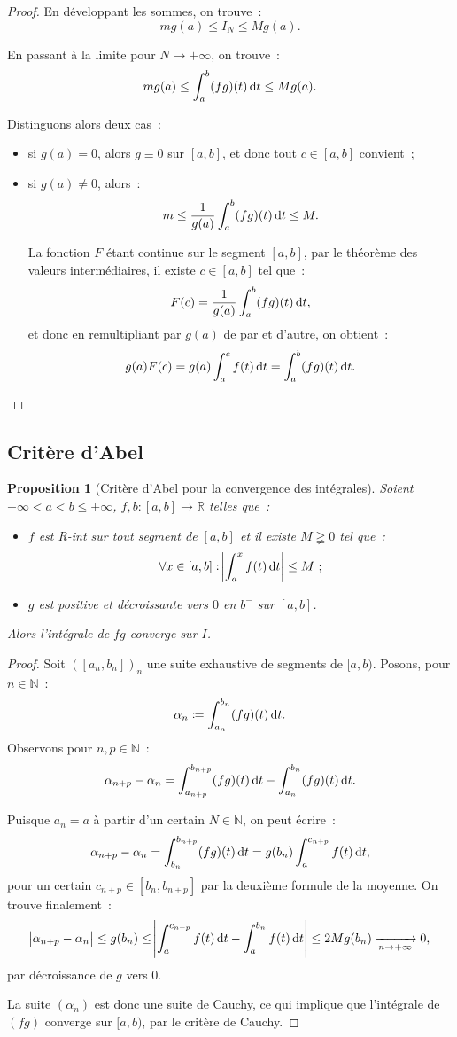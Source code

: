 \documentclass{report}
\newtheorem{prp}[thm]{Proposition}
\theoremstyle{definition}
\theoremstyle{remark}
\newcommand{\R}{\mathbb R}
\newcommand{\N}{\mathbb N}
\newcommand{\minfty}{{-\infty}}
\newcommand{\pinfty}{{+\infty}}
\begin{document}
\begin{proof}
			En développant les sommes, on trouve~:
			\[mg(a) \leq I_N \leq Mg(a).\]

			En passant à la limite pour $N \to \pinfty$, on trouve~:
			\[mg(a) \leq \int_a^b(fg)(t)\dif t \leq Mg(a).\]

			Distinguons alors deux cas~:
			\begin{itemize}
				\item si $g(a) = 0$, alors $g \equiv 0$ sur $[a, b]$, et donc tout $c \in [a, b]$ convient~;
				\item si $g(a) \neq 0$, alors~:
				\[m \leq \frac 1{g(a)}\int_a^b(fg)(t)\dif t \leq M.\]

				La fonction $F$ étant continue sur le segment $[a, b]$, par le théorème des valeurs intermédiaires, il existe $c \in [a, b]$ tel que~:
				\[F(c) = \frac 1{g(a)}\int_a^b(fg)(t)\dif t,\]
				et donc en remultipliant par $g(a)$ de par et d'autre, on obtient~:
				\[g(a)F(c) = g(a)\int_a^cf(t)\dif t = \int_a^b(fg)(t)\dif t.\]
			\end{itemize}
			\end{proof}

		\subsection{Critère d'Abel}
			\begin{prp}[Critère d'Abel pour la convergence des intégrales] Soient $\minfty < a < b \leq \pinfty$, $f, b : [a, b] \to \R$ telles que~:
			\begin{itemize}
				\item $f$ est R-int sur tout segment de $[a, b]$ et il existe $M \gneqq 0$ tel que~:
				\[\forall x \in [a, b] : \abs {\int_a^x f(t)\dif t} \leq M~;\]
				\item $g$ est positive et décroissante vers $0$ en $b^-$ sur $[a, b]$.
			\end{itemize}

			Alors l'intégrale de $fg$ converge sur $I$.
			\end{prp}

			\begin{proof} Soit $([a_n, b_n])_n$ une suite exhaustive de segments de $[a, b)$. Posons, pour $n \in \N$~:
			\[\alpha_n \coloneqq \int_{a_n}^{b_n}(fg)(t)\dif t.\]
			Observons pour $n, p \in \N$~:
			\[\alpha_{n+p} - \alpha_n = \int_{a_{n+p}}^{b_{n+p}}(fg)(t)\dif t - \int_{a_n}^{b_n}(fg)(t)\dif t.\]

			Puisque $a_n = a$ à partir d'un certain $N \in \N$, on peut écrire~:
			\[\alpha_{n+p} - \alpha_n = \int_{b_n}^{b_{n+p}}(fg)(t)\dif t = g(b_n)\int_a^{c_{n+p}}f(t)\dif t,\]
			pour un certain $c_{n+p} \in [b_n, b_{n+p}]$ par la deuxième formule de la moyenne. On trouve finalement~:
			\[\abs {\alpha_{n+p} - \alpha_n} \leq g(b_n) \leq \abs {\int_a^{c_{n+p}}f(t)\dif t - \int_a^{b_n}f(t)\dif t} \leq 2Mg(b_n) \xrightarrow[n \to \pinfty]{} 0,\]
			par décroissance de $g$ vers $0$.

			La suite $(\alpha_n)$ est donc une suite de Cauchy, ce qui implique que l'intégrale de $(fg)$ converge sur $[a, b)$, par le critère de Cauchy.
			\end{proof}
\end{document}
